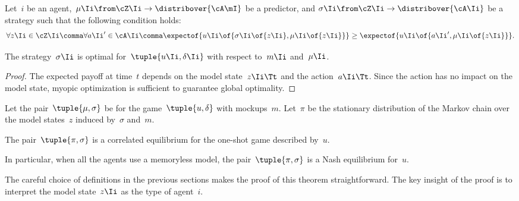 \begin{proposition}
\label{res:myopic_optimality}
Let~\(i\) be an agent,~\(\mu\Ii \from \cZ\Ii \to \distribover{\cA\mI}\) be a predictor, and \(\sigma\Ii \from \cZ\Ii \to \distribover{\cA\Ii}\) be a strategy such that the following condition holds:
\[
\forall z\Ii \in \cZ\Ii \comma
\forall a\Ii' \in \cA\Ii \comma
\expectof{u\Ii \of{\sigma\Ii \of{z\Ii}, \mu\Ii \of{z\Ii}}}
\ge
\expectof{u\Ii \of{a\Ii', \mu\Ii \of{z\Ii}}}
.
\]

The strategy~\(\sigma\Ii\) is optimal for~\(\tuple{u\Ii, \delta\Ii}\) with respect to~\(m\Ii\) and~\(\mu\Ii\).
\end{proposition}

\begin{proof}
The expected payoff at time~\(t\) depends on the model state~\(z\Ii\Tt\) and the action~\(a\Ii\Tt\).
Since the action has no impact on the model state, myopic optimization is sufficient to guarantee global optimality.
\end{proof}

\begin{theorem}
Let the pair~\(\tuple{\mu, \sigma}\) be  for the game~\(\tuple{u, \delta}\) with mockups~\(m\).
Let~\(\pi\) be the stationary distribution of the Markov chain over the model states~\(z\) induced by~\(\sigma\) and~\(m\).

The pair~\(\tuple{\pi, \sigma}\) is a correlated equilibrium for the one-shot game described by~\(u\).
\end{theorem}

In particular, when all the agents use a memoryless model, the pair~\(\tuple{\pi, \sigma}\) is a Nash equilibrium for~\(u\).

The careful choice of definitions in the previous sections makes the proof of this theorem straightforward.
The key insight of the proof is to interpret the model state~\(z\Ii\) as the type of agent~\(i\).

